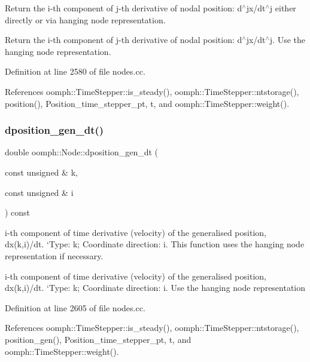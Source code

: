 Return the i-\/th component of j-\/th derivative of nodal position\+: d$^\wedge$jx/dt$^\wedge$j either directly or via hanging node representation. 

Return the i-\/th component of j-\/th derivative of nodal position\+: d$^\wedge$jx/dt$^\wedge$j. Use the hanging node representation. 

Definition at line 2580 of file nodes.\+cc.



References oomph\+::\+Time\+Stepper\+::is\+\_\+steady(), oomph\+::\+Time\+Stepper\+::ntstorage(), position(), Position\+\_\+time\+\_\+stepper\+\_\+pt, t, and oomph\+::\+Time\+Stepper\+::weight().

\mbox{\label{classoomph_1_1Node_af99eb195bbe21b6e380681f2167fbfb5}} 
\subsubsection{\texorpdfstring{dposition\+\_\+gen\+\_\+dt()}{dposition\_gen\_dt()}\hspace{0.1cm}{\footnotesize\ttfamily [1/2]}}
{\footnotesize\ttfamily double oomph\+::\+Node\+::dposition\+\_\+gen\+\_\+dt (\begin{DoxyParamCaption}\item[{const unsigned \&}]{k,  }\item[{const unsigned \&}]{i }\end{DoxyParamCaption}) const}



i-\/th component of time derivative (velocity) of the generalised position, dx(k,i)/dt. `\+Type\textquotesingle{}\+: k; Coordinate direction\+: i. This function uses the hanging node representation if necessary. 

i-\/th component of time derivative (velocity) of the generalised position, dx(k,i)/dt. `\+Type\textquotesingle{}\+: k; Coordinate direction\+: i. Use the hanging node representation 

Definition at line 2605 of file nodes.\+cc.



References oomph\+::\+Time\+Stepper\+::is\+\_\+steady(), oomph\+::\+Time\+Stepper\+::ntstorage(), position\+\_\+gen(), Position\+\_\+time\+\_\+stepper\+\_\+pt, t, and oomph\+::\+Time\+Stepper\+::weight().

